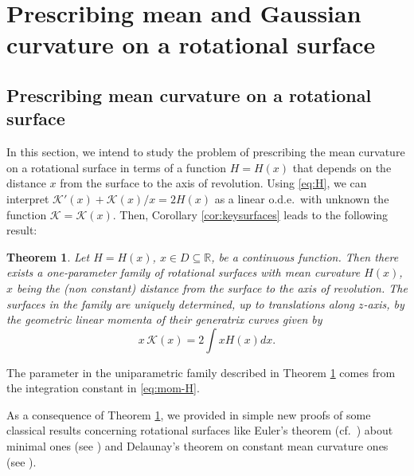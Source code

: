 \documentclass[leqno,11pt]{amsart}
\def\R{\mathbb{R}}
\newtheorem{theorem}{Theorem}[section]
\theoremstyle{definition}
\numberwithin{equation}{section}
\begin{document}



\section{Prescribing mean and Gaussian curvature on a rotational surface}\label{Sect4}

\subsection{Prescribing mean curvature on a rotational surface}\label{SectHprescribed}

In this section, we intend to study the problem of prescribing the mean curvature on a rotational surface in terms of a function $H=H(x)$ that depends on the distance $x$ from the surface to the axis of revolution. Using \eqref{eq:H}, we can interpret $\mathcal K'(x)+\mathcal K(x)/x=2H(x)$ as a linear o.d.e.\ with unknown the function $\mathcal K=\mathcal K(x)$. Then, Corollary \ref{cor:keysurfaces} leads to the following result:

\begin{theorem}\cite[Theorem 4.(a)]{CC22}
	\label{th:Prescribe_H}
 Let $H=H(x)$, $x\in D \subseteq \R $, be a continuous function. 
		Then there exists a one-parameter family of rotational surfaces with mean curvature $H(x)$, 
		$x$ being the (non constant) distance from the surface to the axis of revolution.
		The surfaces in the family are uniquely determined, up to translations along $z$-axis, by the geometric linear momenta of their generatrix curves given by
		\begin{equation}\label{eq:mom-H}
			x \, \mathcal K (x) =2 \! \int \! x  H(x) dx.
		\end{equation}
\end{theorem}
The parameter in the uniparametric family described in Theorem \ref{th:Prescribe_H} comes from the integration constant in \eqref{eq:mom-H}.

As a consequence of Theorem \ref{th:Prescribe_H}, we provided in \cite[Section 4]{CC22}  simple new proofs of some classical results concerning rotational surfaces like Euler's theorem (cf.\ \cite{E44}) about minimal ones (see \cite[Corollary 3]{CC22}) and Delaunay's theorem on constant mean curvature ones (see \cite[Corollary 4]{CC22}).  
\end{document}
